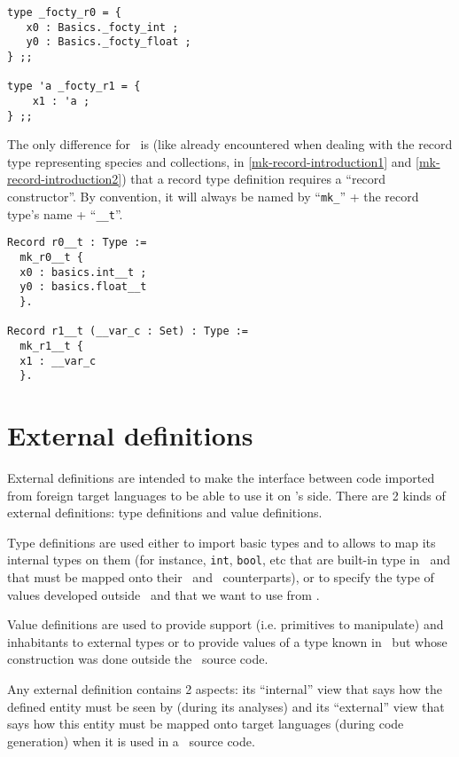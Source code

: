 {\footnotesize
\begin{lstlisting}[language=MyOCaml,
                   title=Generated record type definitions in \ocaml]
type _focty_r0 = { 
   x0 : Basics._focty_int ;
   y0 : Basics._focty_float ;
} ;;

type 'a _focty_r1 = { 
    x1 : 'a ;
} ;;
\end{lstlisting}
}

The only difference for \coq\ is (like already encountered when
dealing with the record type representing species and collections,
in \ref{mk-record-introduction1} and \ref{mk-record-introduction2}) 
that a record type definition requires a ``record constructor''. By
convention, it will always be named by ``{\tt mk\_}'' + the record
type's name + ``{\tt \_\_t}''. 

{\footnotesize
\begin{lstlisting}[language=MyCoq,
                   title=Generated record type definitions in \coq]
Record r0__t : Type :=
  mk_r0__t {
  x0 : basics.int__t ;
  y0 : basics.float__t
  }.

Record r1__t (__var_c : Set) : Type :=
  mk_r1__t {
  x1 : __var_c
  }.
\end{lstlisting}
}


\section{External definitions}
External definitions are intended to make the interface between code
imported from foreign target languages to be able to use it on
\focalize's side. There are 2 kinds of external definitions: type
definitions and value definitions.

Type definitions are used either to import basic types and to allows
\focalize to map its internal types on them (for instance, {\tt int},
{\tt bool}, etc that are built-in type in \focalize\ and that must be
mapped onto their \ocaml\ and \coq\ counterparts), or to specify the
type of values developed outside \focalize\ and that we want to use
from \focalize.

Value definitions are used to provide support (i.e. primitives to
manipulate) and inhabitants to external types or to provide values of
a type known in \focalize\ but whose construction was done outside the
\focalize\ source code.

Any external definition contains 2 aspects: its ``internal'' view that
says how the defined entity must be seen by \focalize (during its
analyses) and its ``external'' view that says how this entity must be
mapped onto target languages (during code generation) when it is used
in a \focalize\ source code.


